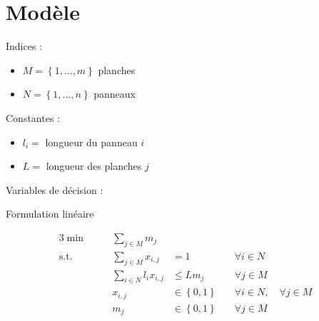 \documentclass{article}[A4]
\begin{document}
\section{Modèle}
Indices :
\begin{itemize}
    \item[] $M = \left\{1, ..., m\right\}$ planches
    \item[] $N = \left\{1, ..., n\right\}$ panneaux
\end{itemize}
Constantes :
\begin{itemize}
    \item[] $l_{i} =$ longueur du panneau $i$
    \item[] $L =$ longueur des planches $j$
\end{itemize}
Variables de décision :
\begin{algorithm}[H]
\caption{Formulation linéaire}
\begin{alignat}{3}
    \min        &\quad& \sum\limits_{j \in M} m_{j}                        &                                   &\\
    \text{s.t.} &\quad& \sum\limits_{j \in M} x_{i,j}                      & = 1                               &\quad\forall i \in N\\
                &\quad& \sum\limits_{i \in N} l_{i} x_{i,j}                &\leq L m_{j}                       &\quad\forall j \in M\\ 
                &\quad& x_{i,j}                                            &\in \left\{0, 1\right\}            &\quad\forall i \in N, \quad\forall j \in M\\
                &\quad& m_{j}                                              &\in \left\{0, 1\right\}            & \quad\forall j \in M
\end{alignat}
\end{algorithm}
\end{document}
